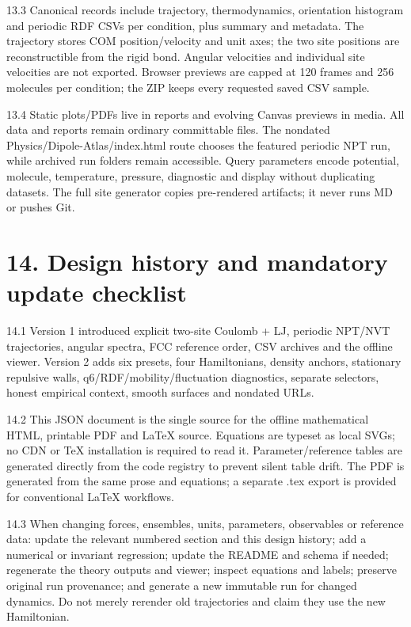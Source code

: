 \documentclass[11pt]{article}
\begin{document}
13.3 Canonical records include trajectory, thermodynamics, orientation histogram and periodic RDF CSVs per condition, plus summary and metadata. The trajectory stores COM position/velocity and unit axes; the two site positions are reconstructible from the rigid bond. Angular velocities and individual site velocities are not exported. Browser previews are capped at 120 frames and 256 molecules per condition; the ZIP keeps every requested saved CSV sample.


13.4 Static plots/PDFs live in reports and evolving Canvas previews in media. All data and reports remain ordinary committable files. The nondated Physics/Dipole-Atlas/index.html route chooses the featured periodic NPT run, while archived run folders remain accessible. Query parameters encode potential, molecule, temperature, pressure, diagnostic and display without duplicating datasets. The full site generator copies pre-rendered artifacts; it never runs MD or pushes Git.


\section*{14. Design history and mandatory update checklist}
14.1 Version 1 introduced explicit two-site Coulomb + LJ, periodic NPT/NVT trajectories, angular spectra, FCC reference order, CSV archives and the offline viewer. Version 2 adds six presets, four Hamiltonians, density anchors, stationary repulsive walls, q6/RDF/mobility/fluctuation diagnostics, separate selectors, honest empirical context, smooth surfaces and nondated URLs.


14.2 This JSON document is the single source for the offline mathematical HTML, printable PDF and LaTeX source. Equations are typeset as local SVGs; no CDN or TeX installation is required to read it. Parameter/reference tables are generated directly from the code registry to prevent silent table drift. The PDF is generated from the same prose and equations; a separate .tex export is provided for conventional LaTeX workflows.


14.3 When changing forces, ensembles, units, parameters, observables or reference data: update the relevant numbered section and this design history; add a numerical or invariant regression; update the README and schema if needed; regenerate the theory outputs and viewer; inspect equations and labels; preserve original run provenance; and generate a new immutable run for changed dynamics. Do not merely rerender old trajectories and claim they use the new Hamiltonian.
\end{document}
